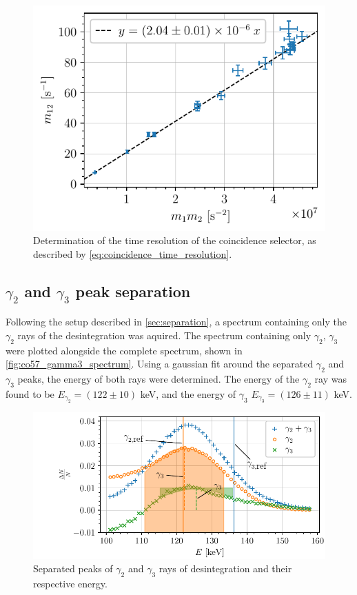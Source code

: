 \begin{figure}[htbp]
    \centering
    \includegraphics[scale=1]{figures/twotheta_cs137.pdf}
    \caption{Determination of the time resolution of the coincidence
    selector, as described by \autoref{eq:coincidence_time_resolution}.}
    \label{fig:twotheta_cs137}
\end{figure}


\subsection{$\gamma_2$ and $\gamma_3$ peak separation}

Following the setup described in \autoref{sec:separation}, a spectrum containing only the \(\gamma_2\) rays of the \cobalt desintegration was aquired. The spectrum containing only \(\gamma_2\), \(\gamma_3\) were plotted alongside the complete spectrum, shown in \autoref{fig:co57_gamma3_spectrum}. Using a gaussian fit around the separated \(\gamma_2\) and \(\gamma_3\) peaks, the energy of both rays were determined. The energy of the \(\gamma_2\) ray was found to be \(E_{\gamma_2} = (122 \pm 10)\) keV, and the energy of \(\gamma_3\) \(E_{\gamma_3} = (126 \pm 11)\) keV.

\begin{figure}[htbp]
    \centering
    \includegraphics[scale=1]{figures/co57_gamma2_gamma3.pdf}
    \caption{Separated peaks of $\gamma_2$ and $\gamma_3$ rays of \cobalt desintegration and their respective energy.}
    \label{fig:co57_gamma3_spectrum}
\end{figure}

